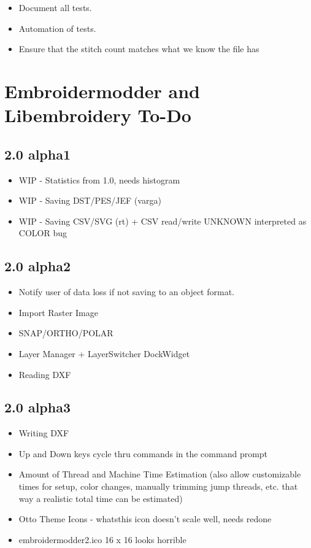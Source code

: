 \begin{itemize}
\item Document all tests.
\item Automation of tests.
\item Ensure that the stitch count matches what we know the file has
\end{itemize}

\section{Embroidermodder and Libembroidery To-Do}

\subsection{2.0 alpha1}

\begin{itemize}
\item WIP - Statistics from 1.0, needs histogram
\item WIP - Saving DST/PES/JEF (varga)
\item WIP - Saving CSV/SVG (rt) + CSV read/write UNKNOWN interpreted as COLOR bug
\end{itemize}

\subsection{2.0 alpha2}

\begin{itemize}
\item Notify user of data loss if not saving to an object format.
\item Import Raster Image
\item SNAP/ORTHO/POLAR
\item Layer Manager + LayerSwitcher DockWidget
\item Reading DXF
\end{itemize}

\subsection{2.0 alpha3}

\begin{itemize}
\item Writing DXF
\item Up and Down keys cycle thru commands in the command prompt
\item Amount of Thread and Machine Time Estimation (also allow customizable times for setup, color changes, manually trimming jump threads, etc. that way a realistic total time can be estimated)
\item Otto Theme Icons - whatsthis icon doesn't scale well, needs redone
\item embroidermodder2.ico 16 x 16 looks horrible
\end{itemize}

